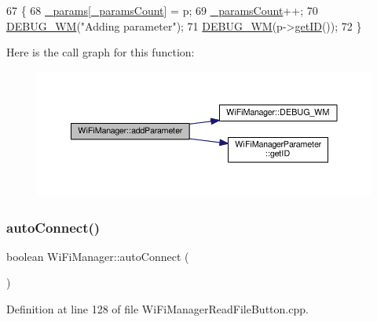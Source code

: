 \begin{DoxyCode}
67                                                       \{
68   \hyperlink{class_wi_fi_manager_a355ce9bbaab94baffd1c83de9b166fea}{\_params}[\hyperlink{class_wi_fi_manager_a22e803d23ae77cb611914445db17c9b6}{\_paramsCount}] = p;
69   \hyperlink{class_wi_fi_manager_a22e803d23ae77cb611914445db17c9b6}{\_paramsCount}++;
70   \hyperlink{class_wi_fi_manager_ae5f595c670ccbcf9a191baf50f5c7c26}{DEBUG\_WM}(\textcolor{stringliteral}{"Adding parameter"});
71   \hyperlink{class_wi_fi_manager_ae5f595c670ccbcf9a191baf50f5c7c26}{DEBUG\_WM}(p->\hyperlink{class_wi_fi_manager_parameter_af57919615418fff788310ba9cc2664d8}{getID}());
72 \}
\end{DoxyCode}
Here is the call graph for this function\+:\nopagebreak
\begin{figure}[H]
\begin{center}
\leavevmode
\includegraphics[width=350pt]{d4/dc8/class_wi_fi_manager_a62907428e5874de097d83c33ef46c80d_cgraph}
\end{center}
\end{figure}
\mbox{\label{class_wi_fi_manager_ae3cdfa6b02edcfe63d7da4f696b62136}} 
\subsubsection{\texorpdfstring{auto\+Connect()}{autoConnect()}\hspace{0.1cm}{\footnotesize\ttfamily [1/2]}}
{\footnotesize\ttfamily boolean Wi\+Fi\+Manager\+::auto\+Connect (\begin{DoxyParamCaption}{ }\end{DoxyParamCaption})}



Definition at line 128 of file Wi\+Fi\+Manager\+Read\+File\+Button.\+cpp.



